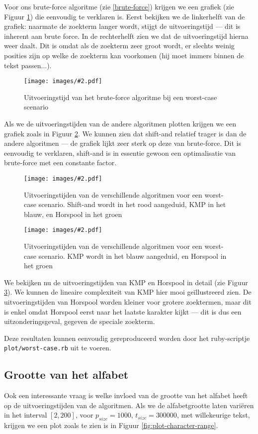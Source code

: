 \documentclass[a4paper,11pt]{article}
\newcommand{\image}[3][1]{
    \begin{figure}
    \begin{center}
    \texttt{[image: images/\#2.pdf]}
    \caption{#3}
    \label{fig:#2}
    \end{center}
    \end{figure}
}
\newcommand{\reproduce}[1]{
    Deze resultaten kunnen eenvoudig gereproduceerd worden door het
    ruby-scriptje \texttt{#1} uit te voeren.
}
\begin{document}
Voor ons brute-force algoritme (zie \ref{brute-force}) krijgen we een grafiek
(zie Figuur \ref{fig:plot-worst-case-brute-force}) die eenvoudig te verklaren
is. Eerst bekijken we de linkerhelft van de grafiek: naarmate de zoekterm langer
wordt, stijgt de uitvoeringstijd — dit is inherent aan brute force. In de
rechterhelft zien we dat de uitvoeringstijd hierna weer daalt. Dit is omdat
als de zoekterm zeer groot wordt, er slechts weinig posities zijn op welke de
zoekterm kan voorkomen (hij moet immers binnen de tekst passen...).

\image{plot-worst-case-brute-force}{Uitvoeringstijd van het brute-force
algoritme bij een worst-case scenario}

Als we de uitvoeringstijden van de andere algoritmen plotten krijgen we een
grafiek zoals in Figuur \ref{fig:plot-worst-case}. We kunnen zien dat shift-and
relatief trager is dan de andere algoritmen — de grafiek lijkt zeer sterk op
deze van brute-force. Dit is eenvoudig te verklaren, shift-and is in essentie
gewoon een optimalisatie van brute-force met een constante factor.

\image{plot-worst-case}{Uitvoeringstijden van de verschillende algoritmen voor
een worst-case scenario. Shift-and wordt in het rood aangeduid, KMP in het
blauw, en Horspool in het groen}

\image{plot-worst-case-detail}{Uitvoeringstijden van de verschillende algoritmen
voor een worst-case scenario. KMP wordt in het blauw aangeduid, en Horspool in
het groen}

We bekijken nu de uitvoeringstijden van KMP en Horspool in detail (zie Figuur
\ref{fig:plot-worst-case-detail}). We kunnen de lineaire complexiteit van KMP
hier mooi ge\"illustreerd zien. De uitvoeringstijden van Horspool worden kleiner
voor grotere zoektermen, maar dit is enkel omdat Horspool eerst naar het laatste
karakter kijkt — dit is dus een uitzonderingsgeval, gegeven de speciale
zoekterm.

\reproduce{plot/worst-case.rb}

\subsection{Grootte van het alfabet}

Ook een interessante vraag is welke invloed van de grootte van het alfabet
heeft op de uitvoeringstijden van de algoritmen. Als we de alfabetgrootte laten
vari\"eren in het interval $[2, 200]$, voor $p_{size} = 1000$, $t_{size} =
300000$, met willekeurige tekst, krijgen we een plot zoals te zien is in Figuur
\ref{fig:plot-character-range}.
\end{document}
